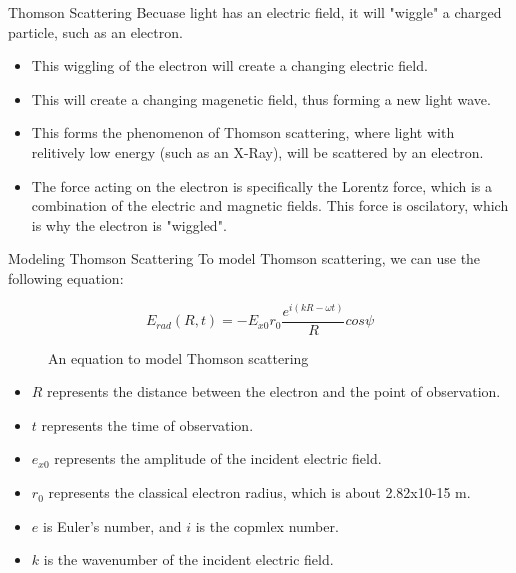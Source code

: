 \documentclass[aspectratio=169]{beamer}
\begin{document}
\begin{frame}[t]{Thomson Scattering}
  Becuase light has an electric field, it will "wiggle" a charged particle, such as an electron.
	\begin{itemize}
		\item This wiggling of the electron will create a changing electric field.
		\item This will create a changing magenetic field, thus forming a new light wave. 
		\item This forms the phenomenon of Thomson scattering, where light with relitively low energy (such as an X-Ray), will be scattered by an electron.
		\item The force acting on the electron is specifically the Lorentz force, which is a combination of the electric and magnetic fields. This force is oscilatory, which is why the electron is "wiggled".
	\end{itemize}
				
\end{frame}

\begin{frame}[t]{Modeling Thomson Scattering}
	To model Thomson scattering, we can use the following equation:
				
	\begin{figure}
		$$ E_{rad}(R, t) = -E_{x0} {r_0} \frac{e^{i(kR-\omega t)}}{R} cos \psi$$
		\caption{An equation to model Thomson scattering}
	\end{figure}
	
	\begin{scriptsize}
		\begin{itemize}
	\item $R$ represents the distance between the electron and the point of observation.
						
	\item $t$ represents the time of observation.
						
	\item $e_{x0}$ represents the amplitude of the incident electric field.
						
	\item $r_0$ represents the classical electron radius, which is about 2.82x10-15 m.
						
	\item $e$ is Euler's number, and $i$ is the copmlex number.
						
	\item $k$ is the wavenumber of the incident electric field.
		\end{itemize}
	\end{scriptsize}						
\end{frame}
\end{document}

